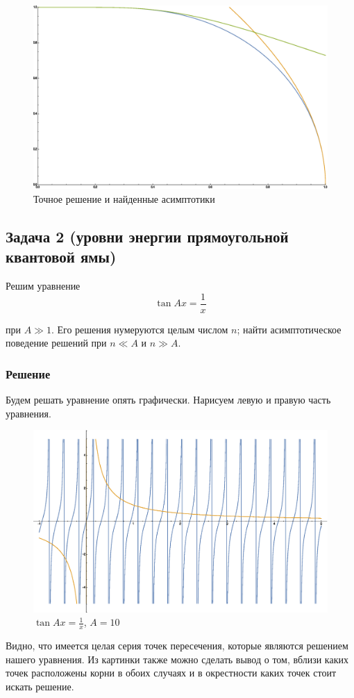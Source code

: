 \documentclass[a4paper,12pt]{article}
\begin{document}
\begin{figure}[h]
	\caption{Точное решение и найденные асимптотики}
	\centering
	\includegraphics[width=0.65\columnwidth]{plotmagn.eps}
\end{figure}



\subsection{Задача 2 (уровни энергии прямоугольной квантовой ямы)}

Решим уравнение
\[
\tan Ax=\frac{1}{x}
\]

\noindent
при $A\gg1$. Его решения нумеруются целым числом $n$; найти асимптотическое
поведение решений при $n\ll A$ и $n\gg A$.


\subsubsection{Решение}

Будем решать уравнение опять графически. Нарисуем левую и правую часть
уравнения.

\begin{figure}[h]
	\caption{$\tan Ax=\frac{1}{x}$, $A=10$}
	\centering
	\includegraphics[width=0.65\columnwidth]{plottan.eps}
\end{figure}

\noindent
Видно, что имеется целая серия точек пересечения, которые являются
решением нашего уравнения. Из картинки также можно сделать вывод о
том, вблизи каких точек расположены корни в обоих случаях и в окрестности
каких точек стоит искать решение.
\end{document}
